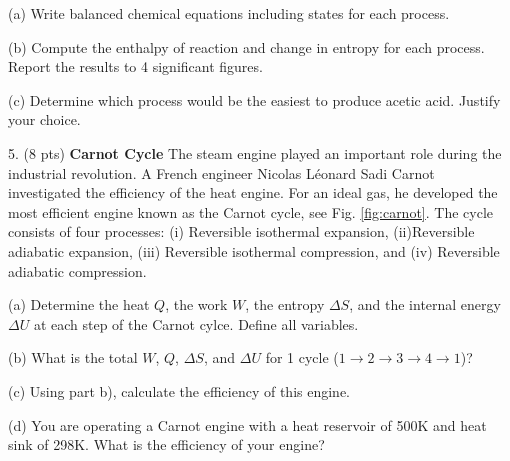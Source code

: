 \documentclass[11pt]{article}
\begin{document}
(a) Write balanced chemical equations including states for each process.

(b) Compute the enthalpy of reaction and change in entropy for each process. Report the results
to 4 significant figures.

(c) Determine which process would be the easiest to produce acetic acid. Justify your choice.


\pagebreak

%

5. (8 pts) \textbf{Carnot Cycle} The steam engine played an important role during the industrial
revolution. A French engineer Nicolas L\'{e}onard Sadi Carnot investigated the efficiency
of the heat engine. For an ideal gas, he developed the most efficient engine known as the Carnot cycle, see
Fig. \ref{fig:carnot}. The cycle consists of four processes: (i) Reversible isothermal expansion,
(ii)Reversible adiabatic expansion, (iii) Reversible isothermal compression, and (iv) Reversible
adiabatic compression.

(a) Determine the heat $Q$, the work $W$, the entropy $\Delta S$, and the internal energy $\Delta U$
at each step of the Carnot cylce. Define all variables.

(b) What is the total $W$, $Q$, $\Delta S$, and $\Delta U$ for 1 cycle ($1\rightarrow 2 \rightarrow 3
\rightarrow 4 \rightarrow 1$)?

(c) Using part b), calculate the efficiency of this engine.

(d) You are operating a Carnot engine with a heat reservoir of 500K and heat sink of
298K. What is the efficiency of your engine?

\end{document}
